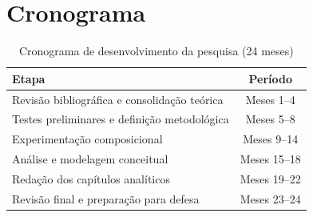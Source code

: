 \chapter{Cronograma}

\begin{table}[h]
\centering
\caption{Cronograma de desenvolvimento da pesquisa (24 meses)}
\begin{tabular}{p{6cm} c}
\hline
Etapa & Período \\ \hline
Revisão bibliográfica e consolidação teórica & Meses 1–4 \\
Testes preliminares e definição metodológica & Meses 5–8 \\
Experimentação composicional & Meses 9–14 \\
Análise e modelagem conceitual & Meses 15–18 \\
Redação dos capítulos analíticos & Meses 19–22 \\
Revisão final e preparação para defesa & Meses 23–24 \\ \hline
\end{tabular}
\end{table}

